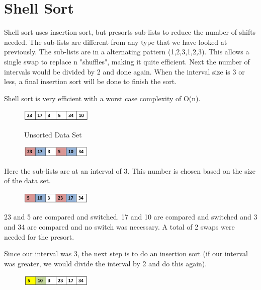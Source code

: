 \section{Shell Sort}

Shell sort uses insertion sort, but presorts sub-lists to reduce the number of shifts needed. The sub-lists are different from any type that we have looked at previously. The sub-lists are in a alternating pattern (1,2,3,1,2,3). This allows a single swap to replace n "shuffles", making it quite efficient. Next the number of intervals would be divided by 2 and done again. When the interval size is 3 or less, a final insertion sort will be done to finish the sort. 

Shell sort is very efficient with a worst case complexity of O(n).

\begin{figure}[H]
\centering
\includegraphics[width=0.3\textwidth]{pictures/shell1.png}
\label{fig:shell1}
\caption{Unsorted Data Set}
\end{figure}

\begin{figure}[H]
\centering
\includegraphics[width=0.3\textwidth]{pictures/shell2.png}
\label{fig:shell2}
\end{figure}

Here the sub-lists are at an interval of 3. This number is chosen based on the size of the data set.  

\begin{figure}[H]
\centering
\includegraphics[width=0.3\textwidth]{pictures/shell3.png}
\label{fig:shell3}
\end{figure}

23 and 5 are compared and switched. 17 and 10 are compared and switched and 3 and 34 are compared and no switch was necessary. A total of 2 swaps were needed for the presort.

Since our interval was 3, the next step is to do an insertion sort (if our interval was greater, we would divide the interval by 2 and do this again).

\begin{figure}[H]
\centering
\includegraphics[width=0.3\textwidth]{pictures/shell4.png}
\label{fig:shell4}
\end{figure}

